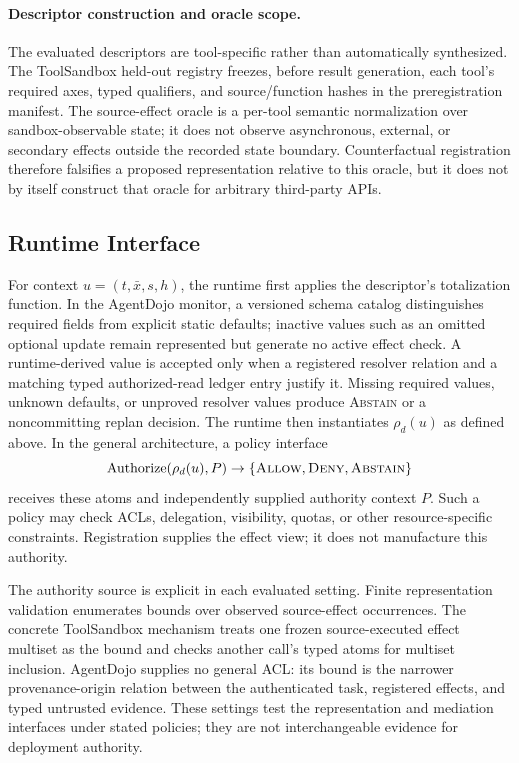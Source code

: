 \documentclass[letterpaper,twocolumn,10pt]{article}
\newcommand{\Allow}{\textnormal{\textsc{Allow}}}
\newcommand{\Deny}{\textnormal{\textsc{Deny}}}
\newcommand{\Abstain}{\textnormal{\textsc{Abstain}}}
\theoremstyle{definition}
\begin{document}
\paragraph{Descriptor construction and oracle scope.}
The evaluated descriptors are tool-specific rather than automatically
synthesized.  The ToolSandbox held-out registry freezes, before result
generation, each tool's required axes, typed qualifiers, and source/function
hashes in the preregistration manifest.  The source-effect oracle is a
per-tool semantic normalization over sandbox-observable state; it does not
observe asynchronous, external, or secondary effects outside the recorded
state boundary.  Counterfactual registration therefore falsifies a proposed
representation relative to this oracle, but it does not by itself construct
that oracle for arbitrary third-party APIs.

\subsection{Runtime Interface}

For context $u=(t,\bar{x},s,h)$, the runtime first applies the descriptor's
totalization function.  In the AgentDojo monitor, a versioned schema catalog
distinguishes required fields from explicit static defaults; inactive values
such as an omitted optional update remain represented but generate no active
effect check.  A runtime-derived value is accepted only when a registered
resolver relation and a matching typed authorized-read ledger entry justify
it.  Missing required values, unknown defaults, or unproved resolver values
produce \Abstain{} or a noncommitting replan decision.  The runtime then
instantiates $\rho_d(u)$ as defined above.  In the general architecture, a
policy interface
\[
  \operatorname{Authorize}(\rho_d(u),P)
       \rightarrow \{\Allow,\Deny,\Abstain\}
\]
receives these atoms and independently supplied authority context $P$.  Such a
policy may check ACLs, delegation, visibility, quotas, or other
resource-specific constraints.  Registration supplies the effect view; it
does not manufacture this authority.

The authority source is explicit in each evaluated setting.  Finite
representation validation enumerates bounds over observed source-effect
occurrences.  The concrete ToolSandbox mechanism treats one frozen
source-executed effect multiset as the bound and checks another call's typed
atoms for multiset inclusion.  AgentDojo supplies no general ACL: its bound is
the narrower provenance-origin relation between the authenticated task,
registered effects, and typed untrusted evidence.  These settings test the
representation and mediation interfaces under stated policies; they are not
interchangeable evidence for deployment authority.
\end{document}
